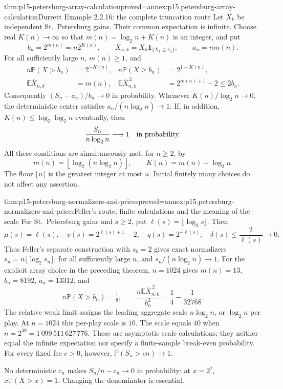 \begin{hbtheorem}{thm:p15-petersburg-array-calculation}{proved=annex:p15.petersburg-array-calculation}{Durrett Example 2.2.16: the complete truncation route}
Let \(X_k\) be independent St.~Petersburg gains.
Their common expectation is infinite. Choose real \(K(n)\to\infty\)
so that \(m(n)=\log_2 n+K(n)\) is an integer, and put
\[
 b_n=2^{m(n)}=n2^{K(n)},\qquad
 \overline X_{n,k}=X_k\mathbf1_{\{X_k\leq b_n\}},\qquad
 a_n=nm(n).
\]
For all sufficiently large \(n\), \(m(n)\geq1\), and
\[
 \begin{aligned}
 n\mathbb P(X>b_n)&=2^{-K(n)},&
 n\mathbb P(X\geq b_n)&=2^{1-K(n)},\\
 \mathbb E\overline X_{n,k}&=m(n),&
 \mathbb E\overline X_{n,k}^{\,2}&=2^{m(n)+1}-2\leq2b_n.
 \end{aligned}
\]
Consequently \((S_n-a_n)/b_n\to0\) in probability.
Whenever \(K(n)/\log_2n\to0\), the deterministic center satisfies
\(a_n/(n\log_2n)\to1\).
If, in addition, \(K(n)\leq\log_2\log_2n\) eventually, then
\[
 \frac{S_n}{n\log_2n}\longrightarrow1
                                      \quad\hbox{in probability}.
\]
All these conditions are simultaneously met, for \(n\geq2\), by
\[
 m(n)=\left\lfloor\log_2(n\log_2n)\right\rfloor,\qquad
 K(n)=m(n)-\log_2n.
\]
The floor \(\lfloor u\rfloor\) is the greatest integer at most \(u\).
Initial finitely many choices do not affect any assertion.
\end{hbtheorem}

\begin{hbtheorem}{thm:p15-petersburg-normalizers-and-prices}{proved=annex:p15.petersburg-normalizers-and-prices}{Feller's route, finite calculations and the meaning of the scale}
For St.~Petersburg gains and \(s\geq2\), put
\(\ell(s)=\lfloor\log_2s\rfloor\). Then
\[
 \mu(s)=\ell(s),\quad
 v(s)=2^{\ell(s)+1}-2,\quad
 q(s)=2^{-\ell(s)},\quad
 \delta(s)\leq\frac{2}{\ell(s)}\longrightarrow0.
\]
Thus Feller's separate construction with \(s_0=2\) gives exact
normalizers \(s_n=n\lfloor\log_2s_n\rfloor\), for all sufficiently
large \(n\), and \(s_n/(n\log_2n)\to1\).
For the explicit array choice in the preceding theorem, \(n=1024\)
gives \(m(n)=13\), \(b_n=8192\), \(a_n=13312\), and
\[
 n\mathbb P(X>b_n)=\tfrac18,\qquad
 \frac{n\mathbb E\overline X_{n,k}^{\,2}}{b_n^2}
                   =\frac14-\frac1{32768}.
\]
The relative weak limit assigns the leading aggregate scale
\(n\log_2n\), or \(\log_2n\) per play. At \(n=1024\) this
per-play scale is \(10\). The scale equals \(40\) when
\(n=2^{40}=1\,099\,511\,627\,776\).
These are asymptotic scale calculations; they neither equal the
infinite expectation nor specify a finite-sample break-even probability.
For every fixed fee \(c>0\), however,
\(\mathbb P(S_n>cn)\to1\).

No deterministic \(c_n\) makes \(S_n/n-c_n\to0\) in probability:
at \(x=2^j\), \(x\mathbb P(X>x)=1\).
Changing the denominator is essential.
\end{hbtheorem}

